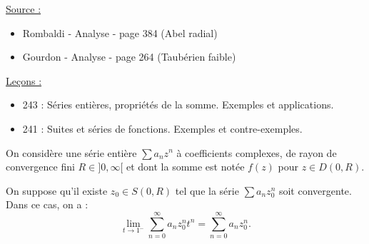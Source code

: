 

\pagestyle{fancy}

\fancyhead[R]{}



\underline{Source :}
\begin{itemize}
\item Rombaldi - Analyse - page 384 (Abel radial) 
\item Gourdon - Analyse - page 264 (Taubérien faible)
\end{itemize} 

\underline{Leçons :}
\begin{itemize}

\item 243 : Séries entières, propriétés de la somme. Exemples et applications.
\item 241 : Suites et séries de fonctions. Exemples et contre-exemples.

\end{itemize}

\begin{nota}
On considère une série entière $\sum a_n z^n$ à coefficients complexes, de rayon de convergence fini $R \in ]0, \infty[$ et dont 
la somme est notée $f(z)$ pour $z \in D(0, R)$.
\end{nota}

\begin{thm}
On suppose qu'il existe $z_0 \in S(0,R)$ tel que la série $\sum a_n z_0^n$ soit convergente. 
Dans ce cas, on a :
\[ \lim_{t \to 1^{-}} \sum_{n=0}^{\infty} a_n z_0^n t^n = \sum_{n=0}^{\infty} a_n z_0^n . \]
\end{thm}

